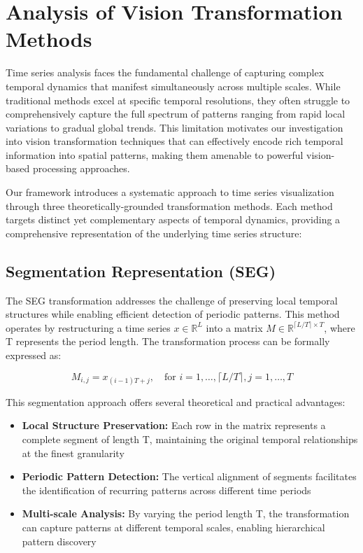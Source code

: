 \newpage
\section{Analysis of Vision Transformation Methods}
\label{appx:transformation}

Time series analysis faces the fundamental challenge of capturing complex temporal dynamics that manifest simultaneously across multiple scales. While traditional methods excel at specific temporal resolutions, they often struggle to comprehensively capture the full spectrum of patterns ranging from rapid local variations to gradual global trends. This limitation motivates our investigation into vision transformation techniques that can effectively encode rich temporal information into spatial patterns, making them amenable to powerful vision-based processing approaches.

Our framework introduces a systematic approach to time series visualization through three theoretically-grounded transformation methods. Each method targets distinct yet complementary aspects of temporal dynamics, providing a comprehensive representation of the underlying time series structure:

\subsection{Segmentation Representation (SEG)}
The SEG transformation addresses the challenge of preserving local temporal structures while enabling efficient detection of periodic patterns. This method operates by restructuring a time series $x \in \mathbb{R}^L$ into a matrix $M \in \mathbb{R}^{\lceil L/T \rceil \times T}$, where T represents the period length. The transformation process can be formally expressed as:

\begin{equation}
    M_{i,j} = x_{(i-1)T + j}, \quad \text{for } i=1,\dots,\lceil L/T \rceil, j=1,\dots,T
\end{equation}

This segmentation approach offers several theoretical and practical advantages:

\begin{itemize}
    \item \textbf{Local Structure Preservation:} Each row in the matrix represents a complete segment of length T, maintaining the original temporal relationships at the finest granularity
    \item \textbf{Periodic Pattern Detection:} The vertical alignment of segments facilitates the identification of recurring patterns across different time periods
    \item \textbf{Multi-scale Analysis:} By varying the period length T, the transformation can capture patterns at different temporal scales, enabling hierarchical pattern discovery
\end{itemize}

